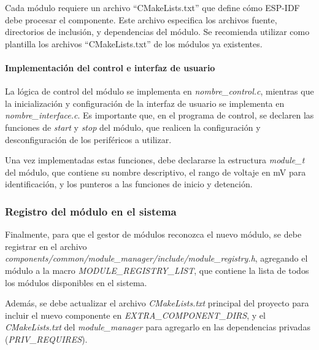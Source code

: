 Cada módulo requiere un archivo ``CMakeLists.txt'' que define cómo ESP-IDF debe procesar el componente. Este archivo especifica los archivos fuente, directorios de inclusión, y dependencias del módulo. Se recomienda utilizar como plantilla los archivos ``CMakeLists.txt'' de los módulos ya existentes.

\paragraph{Implementación del control e interfaz de usuario}

La lógica de control del módulo se implementa en \textit{nombre\_control.c}, mientras que la inicialización y configuración de la interfaz de usuario se implementa en \textit{nombre\_interface.c}. Es importante que, en el programa de control, se declaren las funciones de \textit{start} y \textit{stop} del módulo, que realicen la configuración y desconfiguración de los periféricos a utilizar.

Una vez implementadas estas funciones, debe declararse la estructura \textit{module\_t} del módulo, que contiene su nombre descriptivo, el rango de voltaje en \unit{\milli\volt} para identificación, y los punteros a las funciones de inicio y detención.

\subsubsection{Registro del módulo en el sistema}

Finalmente, para que el gestor de módulos reconozca el nuevo módulo, se debe registrar en el archivo \textit{components/common/module\_manager/include/module\_registry.h}, agregando el módulo a la macro \textit{MODULE\_REGISTRY\_LIST}, que contiene la lista de todos los módulos disponibles en el sistema.

Además, se debe actualizar el archivo \textit{CMakeLists.txt} principal del proyecto para incluir el nuevo componente en \textit{EXTRA\_COMPONENT\_DIRS}, y el \textit{CMakeLists.txt} del \textit{module\_manager} para agregarlo en las dependencias privadas (\textit{PRIV\_REQUIRES}).